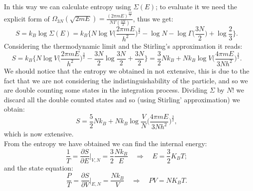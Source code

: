 \begin{example}
    In this way we can calculate entropy using $\Sigma(E)$; to evaluate it we need the explicit form of $\Omega_{3N}(\sqrt{2mE})=\frac{(2\pi mE)^{\frac{3N}{2}}}{N\Gamma(\frac{3N}{2})}$, thus we get:
    \begin{equation*}
        S=k_B\log\Sigma(E)=k_B\bigg\{N\log V\bigg(\frac{2\pi mE}{h^2}\bigg)^{\frac{3}{2}}-\log N-\log\Gamma\bigg(\frac{3N}{2}\bigg)+\log\frac{2}{3}\bigg\}.
    \end{equation*}
    Considering the thermodynamic limit and the Stirling's approximation it reads:
    \begin{equation*}
        S=k_B\bigg\{N\log V\bigg(\frac{2\pi mE}{h^2}\bigg)^{\frac{3}{2}}-\frac{3N}{2}\log\frac{3N}{2}+\frac{3N}{2}\bigg\}=\frac{3}{2}Nk_B+Nk_B\log V\bigg(\frac{4\pi mE}{3Nh^2}\bigg)^{\frac{3}{2}}.
    \end{equation*}
    We should notice that the entropy we obtained in not extensive, this is due to the fact that we are not considering the indistinguishability of the particle, and so we are double counting some states in the integration process. Dividing $\Sigma$ by $N!$ we discard all the double counted states and so (using Stirling' approximation) we obtain:
    \begin{equation*}
        S=\frac{5}{2}Nk_B+Nk_B\log \frac{V}{N}\bigg(\frac{4\pi mE}{3Nh^2}\bigg)^{\frac{3}{2}},
    \end{equation*}
    which is now extensive.\\From the entropy we have obtained we can find the internal energy:
    \begin{equation*}
        \frac{1}{T}=\frac{\partial S}{\partial E}\bigg|_{V,N}=\frac{3}{2}\frac{Nk_B}{E}\quad\Rightarrow\quad E=\frac{3}{2}K_B T;
    \end{equation*}
    and the state equation:
    \begin{equation*}
        \frac{P}{T}=\frac{\partial S}{\partial V}\bigg|_{E,N}=\frac{Nk_B}{V}\quad\Rightarrow\quad PV=NK_B T.
    \end{equation*}
\end{example}
